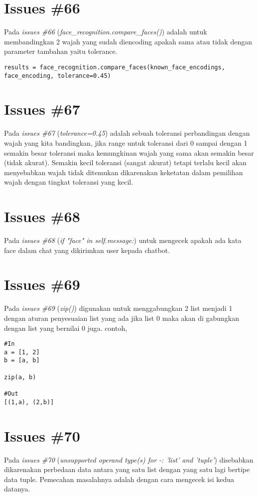\section{Issues \#66}
Pada \textit{issues \#66} (\textit{face\_recognition.compare\_faces()}) adalah untuk membandingkan 2 wajah yang sudah diencoding apakah sama atau tidak dengan parameter tambahan yaitu tolerance.
\begin{verbatim}
results = face_recognition.compare_faces(known_face_encodings, face_encoding, tolerance=0.45)
\end{verbatim}

\section{Issues \#67}
Pada \textit{issues \#67} (\textit{tolerance=0.45}) adalah sebuah toleransi perbandingan dengan wajah yang kita bandingkan, jika range untuk toleransi dari 0 sampai dengan 1 semakin besar toleransi maka kemungkinan wajah yang sama akan semakin besar (tidak akurat). Semakin kecil toleransi (sangat akurat) tetapi terlalu kecil akan menyebabkan wajah tidak ditemukan dikarenakan keketatan dalam pemilihan wajah dengan tingkat toleransi yang kecil.

\section{Issues \#68}
Pada \textit{issues \#68} (\textit{if "face" in self.message:}) untuk mengecek apakah ada kata face dalam chat yang dikirimkan user kepada chatbot.

\section{Issues \#69}
Pada \textit{issues \#69} (\textit{zip()}) digunakan untuk menggabungkan 2 list menjadi 1 dengan aturan penyesuaian list yang ada jika list 0 maka akan di gabungkan dengan list yang bernilai 0 juga. contoh,
\begin{verbatim}
#In
a = [1, 2]
b = [a, b]

zip(a, b)

#Out
[(1,a), (2,b)]
\end{verbatim}

\section{Issues \#70}
Pada \textit{issues \#70} (\textit{unsupported operand type(s) for -: 'list' and 'tuple'}) disebabkan dikarenakan perbedaan data antara yang satu list dengan yang satu lagi bertipe data tuple. Pemecahan masalahnya adalah dengan cara mengecek isi kedua datanya.


